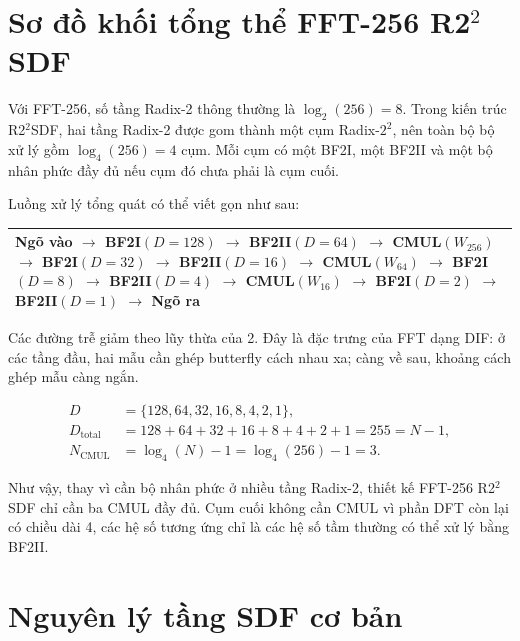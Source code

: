 \documentclass[12pt,a4paper]{report}
\numberwithin{equation}{chapter}
\begin{document}
\section[Sơ đồ khối tổng thể FFT-256 R2 bình phương SDF]{Sơ đồ khối tổng thể FFT-256 R2$^2$SDF}
\label{sec:r22rtl_top_architecture}

Với FFT-256, số tầng Radix-2 thông thường là $\log_2(256)=8$. Trong kiến trúc R2$^2$SDF, hai tầng Radix-2 được gom thành một cụm Radix-$2^2$, nên toàn bộ bộ xử lý gồm $\log_4(256)=4$ cụm. Mỗi cụm có một BF2I, một BF2II và một bộ nhân phức đầy đủ nếu cụm đó chưa phải là cụm cuối.

Luồng xử lý tổng quát có thể viết gọn như sau:
\begin{center}
\small
\begin{tabularx}{\textwidth}{X}
\toprule
Ngõ vào $\rightarrow$ BF2I$(D=128)$ $\rightarrow$ BF2II$(D=64)$ $\rightarrow$ CMUL$(W_{256})$ $\rightarrow$ BF2I$(D=32)$ $\rightarrow$ BF2II$(D=16)$ $\rightarrow$ CMUL$(W_{64})$ $\rightarrow$ BF2I$(D=8)$ $\rightarrow$ BF2II$(D=4)$ $\rightarrow$ CMUL$(W_{16})$ $\rightarrow$ BF2I$(D=2)$ $\rightarrow$ BF2II$(D=1)$ $\rightarrow$ Ngõ ra \\
\bottomrule
\end{tabularx}
\end{center}

Các đường trễ giảm theo lũy thừa của 2. Đây là đặc trưng của FFT dạng DIF: ở các tầng đầu, hai mẫu cần ghép butterfly cách nhau xa; càng về sau, khoảng cách ghép mẫu càng ngắn.

\begin{align}
    D &= \{128,64,32,16,8,4,2,1\},
    \label{eq:r22rtl_delay_set}\\
    D_{\mathrm{total}} &=128+64+32+16+8+4+2+1=255=N-1, 
    \label{eq:r22rtl_total_delay}\\
    N_{\mathrm{CMUL}} &=\log_4(N)-1=\log_4(256)-1=3.
    \label{eq:r22rtl_cmul_count}
\end{align}

Như vậy, thay vì cần bộ nhân phức ở nhiều tầng Radix-2, thiết kế FFT-256 R2$^2$SDF chỉ cần ba CMUL đầy đủ. Cụm cuối không cần CMUL vì phần DFT còn lại có chiều dài 4, các hệ số tương ứng chỉ là các hệ số tầm thường có thể xử lý bằng BF2II.

\section{Nguyên lý tầng SDF cơ bản}
\label{sec:r22rtl_sdf_principle}
\end{document}
